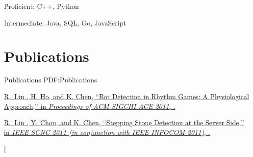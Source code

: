 \documentclass[a4paper,10pt,oneside]{article}
\newcommand{\CVNote}{CV compiled on {\today}}
\begin{document}
\begin{body}
Proficient: C++, Python
\par
Intermediate: Java, SQL, Go, JavaScript


\section{Publications}
{Publications}
{PDF:Publications}

\href{http://mmnet.iis.sinica.edu.tw/publication_detail.html?key=lin11_rhythm_bots}
{
\underline{R.~Lin} , H. Ho, and K. Chen,
``Bot Detection in Rhythm Games: A Physiological Approach,''
in \textit{Proceedings of ACM SIGCHI ACE 2011},
.
}

\href{http://mmnet.iis.sinica.edu.tw/publication_detail.html?key=lin11_stepping_stone}
{
\underline{R.~Lin} , Y. Chou, and K. Chen,
``Stepping Stone Detection at the Server Side,''
in \textit{IEEE SCNC 2011 (in conjunction with IEEE INFOCOM 2011)},
.
}












\end{body}


\begin{flushright}
\scriptsize%
[%
\hspace{2.0mm}\null
\end{flushright}

\label{LastPage}~
\end{document}
